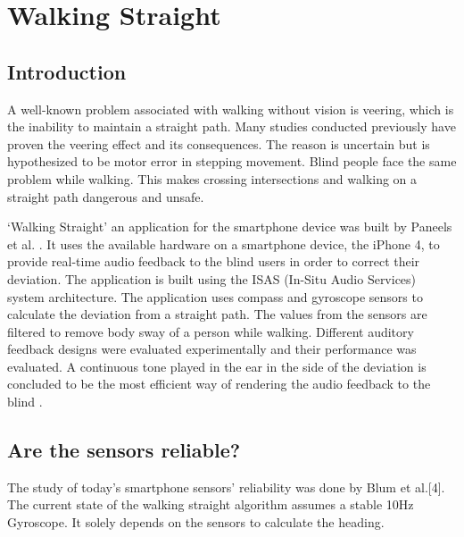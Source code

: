 \chapter{Walking Straight}
\label{chap:intro}

\section{Introduction}

\label{sec:xrefs}

A well-known problem associated with walking without vision is veering, which is the inability to maintain a straight path. Many studies conducted previously have proven the veering effect and its consequences. The reason is uncertain but is hypothesized to be motor error in stepping movement.  Blind people face the same problem while walking. This makes crossing intersections and walking on a straight path dangerous and unsafe.

‘Walking Straight’ an application for the smartphone device was built by Paneels et al. \cite{walkingstraight}. It uses the available hardware on a smartphone device, the iPhone 4, to provide real-time audio feedback to the blind users in order to correct their deviation. The application is built using the ISAS (In-Situ Audio Services) \cite{BlumMonet} system architecture. The application uses compass and gyroscope sensors to calculate the deviation from a straight path. The values from the sensors are filtered to remove body sway of a person while walking. Different auditory feedback designs were evaluated experimentally and their performance was evaluated. A continuous tone played in the ear in the side of the deviation is concluded to be the most efficient way of rendering the audio feedback to the blind \cite{walkingstraight}.

\section{Are the sensors reliable?}

The study of today’s smartphone sensors’ reliability was done by Blum et al.[4]. The current state of the walking straight algorithm assumes a stable 10Hz Gyroscope. It solely depends on the sensors to calculate the heading.  



